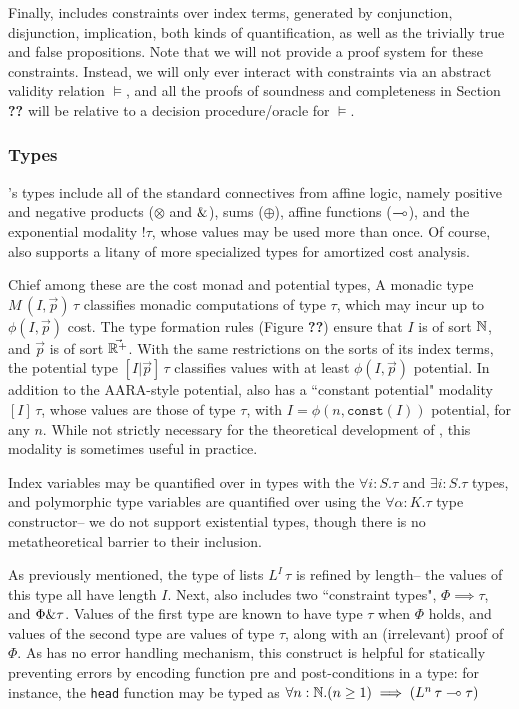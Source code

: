 Finally, \dlambdaamor includes constraints over index terms, generated by conjunction, disjunction, implication, both kinds of quantification, as well as the trivially true and false propositions. Note that we will not provide a proof system for these constraints. Instead, we will only ever interact with constraints via an abstract validity relation $\vDash$, and all the proofs of soundness and completeness in Section \textbf{??} will be relative to a decision procedure/oracle for $\vDash$.

\subsubsection{Types}
\dlambdaamor's types include all of the standard connectives from affine logic, namely positive and negative products ($\otimes$ and $\&$), sums ($\oplus$), affine functions ($\multimap$), and the exponential modality $! \tau$, whose values may be used more than once.
Of course, \dlambdaamor also supports a litany of more specialized types for amortized cost analysis.

Chief among these are the cost monad and potential types, A monadic type $M \, (I,\vec{p}) \, \tau$ classifies monadic computations of type $\tau$, which may incur up to $\phi(I,\vec{p})$ cost. The type formation rules (Figure \textbf{??}) ensure that $I$ is of sort $\mathbb{N}$, and $\vec{p}$ is of sort $\vec{\mathbb{R}^+}$. With the same restrictions on the sorts of its index terms, the potential type $[I|\vec{p}]\, \tau$ classifies values with at least $\phi(I,\vec{p})$ potential. In addition to the AARA-style potential, \dlambdaamor also has a ``constant potential" modality $[I] \, \tau$, whose values are those of type $\tau$, with $I = \phi(n,\texttt{const}(I))$ potential, for any $n$. While not strictly necessary for the theoretical development of \dlambdaamor, this modality is sometimes useful in practice.

Index variables may be quantified over in types with the $\forall i : S.\tau$ and $\exists i : S.\tau$ types, and polymorphic type variables are quantified over using the $\forall \alpha : K .\tau$ type constructor-- we do not support existential types, though there is no metatheoretical barrier to their inclusion.

As previously mentioned, the type of lists $L^I \, \tau$ is refined by length-- the values of this type all have length $I$. Next, \dlambdaamor also includes two ``constraint types", $\Phi \implies \tau$, and $\Phi \& \tau$. Values of the first type are known to have type $\tau$ when $\Phi$ holds, and values of the second type are values of type $\tau$, along with an (irrelevant) proof of $\Phi$. As \lambdaamor has no error handling mechanism, this construct is helpful for statically preventing errors by encoding function pre and post-conditions in a type: for instance, the \texttt{head} function may be typed as $\forall n : \mathbb{N}. (n \geq 1) \implies (L^n \, \tau \multimap \tau)$

